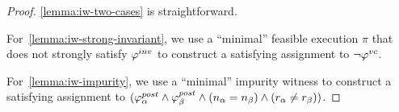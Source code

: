 \begin{proof}


\ref{lemma:iw-two-cases} is straightforward.

For~\ref{lemma:iw-strong-invariant}, we use a ``minimal'' feasible execution $\pi$ that does not strongly satisfy $\varphi^{inv}$
to construct a satisfying assignment to $\neg \varphi^{vc}$.

For~\ref{lemma:iw-impurity}, we use a ``minimal'' impurity witness to construct a satisfying assignment to
$(\varphi^{post}_\alpha \wedge \varphi^{post}_\beta \wedge (n_\alpha = n_\beta) \wedge (r_\alpha \neq r_\beta))$.

%
%
\end{proof}

